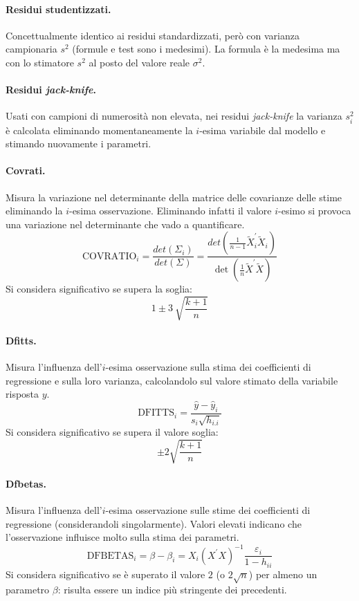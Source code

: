 \documentclass[a4page, 11pt]{article} %
\begin{document}
\paragraph{Residui studentizzati.} Concettualmente identico ai residui standardizzati, però con varianza campionaria $s^2$ (formule e test sono i medesimi).
La formula è la medesima ma con lo stimatore $s^2$ al posto del valore reale $\sigma^2$.

\paragraph{Residui \textit{jack-knife}.} Usati con campioni di numerosità non elevata, nei residui \textit{jack-knife} la varianza $s^2_i$ è calcolata eliminando momentaneamente la $i$-esima variabile dal modello e stimando nuovamente i parametri.

\paragraph{Covrati.} Misura la variazione nel determinante della matrice delle covarianze delle stime eliminando la $i$-esima osservazione.
Eliminando infatti il valore $i$-esimo si provoca una variazione nel determinante che vado a quantificare.
\begin{equation*}
\text{COVRATIO}_i = \frac{det(\Sigma_i)}{det(\Sigma)} = \frac{det(\frac{1}{n - 1}\tilde{X}^{\prime}_i\tilde{X}_i)}{\det(\frac{1}{n}\tilde{X}^{\prime}\tilde{X})}
\end{equation*}
Si considera significativo se supera la soglia:
\begin{equation*}
1 \pm 3 \  \sqrt{\frac{k + 1}{n}}
\end{equation*}

\paragraph{Dfitts.} Misura l’influenza dell'$i$-esima osservazione sulla stima dei coefficienti di regressione e sulla loro varianza, calcolandolo sul valore stimato della variabile risposta $y$.
\begin{equation*}
\text{DFITTS}_i = \frac{\hat{y} - \hat{y}_i}{s_i\sqrt{h_{i.i}}}
\end{equation*}
Si considera significativo se supera il valore soglia:
\begin{equation*}
\pm 2 \sqrt{\frac{k+1}{n}}
\end{equation*}

\paragraph{Dfbetas.} Misura l’influenza dell'$i$-esima osservazione sulle stime dei coefficienti di regressione (considerandoli singolarmente).
Valori elevati indicano che l'osservazione influisce molto sulla stima dei parametri.
\begin{equation*}
\text{DFBETAS}_i = \beta - \beta_i = X_i(X^{\prime}X)^{-1}\frac{\varepsilon_i}{1-h_{ii}}
\end{equation*}
Si considera significativo se è superato il valore $2$ (o $2 \sqrt{n}$) per almeno un parametro $\beta$: risulta essere un indice più stringente dei precedenti.
\end{document}
